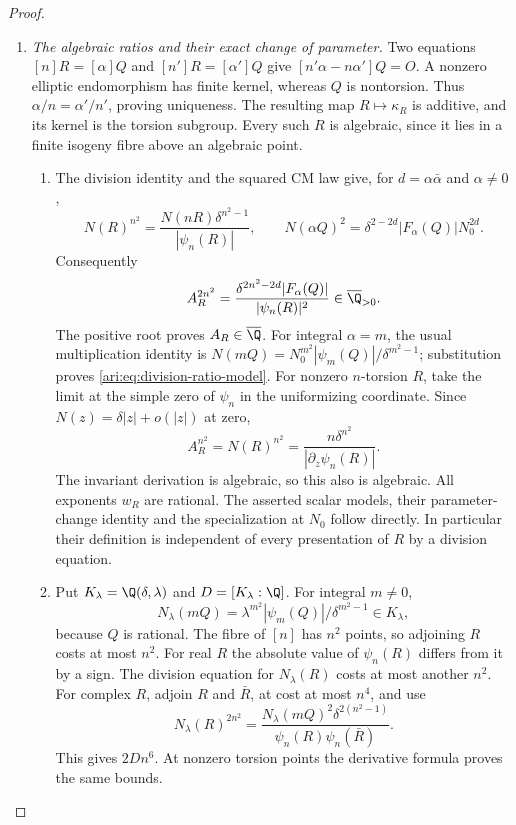 \begin{proof}\leavevmode\par


 
\begin{enumerate}[label=\arabic*.,leftmargin=0pt,labelsep=.5em]
\item \emph{The algebraic ratios and their exact change of parameter.}
Two equations $[n]R=[\alpha]Q$ and $[n']R=[\alpha']Q$
give $[n'\alpha-n\alpha']Q=O$. A nonzero elliptic endomorphism
has finite kernel, whereas $Q$ is nontorsion. Thus
$\alpha/n=\alpha'/n'$, proving uniqueness. The resulting
map $R\mapsto\kappa_R$ is additive, and its kernel is the
torsion subgroup. Every such $R$ is algebraic, since it lies
in a finite isogeny fibre above an algebraic point.


\begin{enumerate}[label={$\langle2\rangle$\arabic*.},leftmargin=1.3em,labelsep=.5em]
\item  The division identity and the squared CM law give, for
$d=\alpha\bar\alpha$ and $\alpha\ne0$,
\[
 N(R)^{n^2}=\frac{N(nR)\delta^{n^2-1}}{|\psi_n(R)|},
 \qquad
 N(\alpha Q)^2=\delta^{2-2d}|F_\alpha(Q)|N_0^{2d}.
\]
Consequently
\[
 A_R^{2n^2}=\frac{\delta^{2n^2-2d}|F_\alpha(Q)|}
                         {|\psi_n(R)|^2}\in\overline\Q_{>0}.
\]
The positive root proves $A_R\in\overline\Q$. For integral
$\alpha=m$, the usual multiplication identity is
$N(mQ)=N_0^{m^2}|\psi_m(Q)|/\delta^{m^2-1}$;
substitution proves \eqref{ari:eq:division-ratio-model}.
For nonzero $n$-torsion $R$, take the limit at the simple zero
of $\psi_n$ in the uniformizing coordinate. Since
$N(z)=\delta|z|+o(|z|)$ at zero,
\[
 A_R^{n^2}=N(R)^{n^2}
       =\frac{n\delta^{n^2}}{|\partial_z\psi_n(R)|}.
\]
The invariant derivation is algebraic, so this also is algebraic.
All exponents $w_R$ are rational. The asserted scalar models,
their parameter-change identity and the specialization at $N_0$
follow directly. In particular their definition is independent
of every presentation of $R$ by a division equation.


\item  Put $K_\lambda=\Q(\delta,\lambda)$ and
$D=[K_\lambda:\Q]$. For integral $m\ne0$,
\[
 N_\lambda(mQ)=\lambda^{m^2}
                     |\psi_m(Q)|/\delta^{m^2-1}\in K_\lambda,
\]
because $Q$ is rational. The fibre of $[n]$ has $n^2$ points,
so adjoining $R$ costs at most $n^2$. For real $R$ the absolute
value of $\psi_n(R)$ differs from it by a sign. The division
equation for $N_\lambda(R)$ costs at most another $n^2$.
For complex $R$, adjoin $R$ and $\bar R$, at cost at most
$n^4$, and use
\[
 N_\lambda(R)^{2n^2}
 =\frac{N_\lambda(mQ)^2\delta^{2(n^2-1)}}
              {\psi_n(R)\psi_n(\bar R)}.
\]
This gives $2Dn^6$. At nonzero torsion points the derivative
formula proves the same bounds.


\end{enumerate}
\end{enumerate}
\end{proof}

